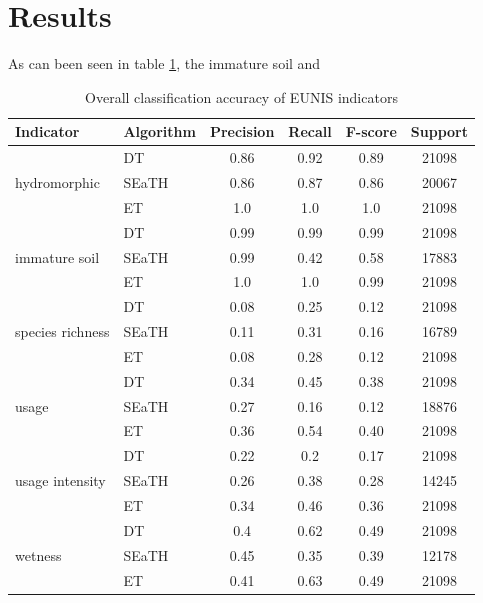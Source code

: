 \documentclass[authoryear, review,12pt,number]{elsarticle}
\begin{document}
\section{Results}
As can been seen in table \ref{tab:accuracy_indicators}, the immature soil and
\begin{table}
    \centering
    \begin{tabular}{l l c c c c}
    Indicator & Algorithm & Precision & Recall & F-score & 
    Support\\
    \hline
    \multirow{3}{*}{hydromorphic}
    & DT & 0.86 & 0.92 & 0.89 & 21098\\
    & SEaTH & 0.86 & 0.87 & 0.86 & 20067\\
    & ET & 1.0 & 1.0 & 1.0 & 21098\\
    \cline{2-6}
    \multirow{3}{*}{immature soil}
    & DT & 0.99 & 0.99 & 0.99 & 21098\\
    & SEaTH & 0.99 & 0.42 & 0.58 & 17883\\
    & ET & 1.0 & 1.0 & 0.99 & 21098\\
    \cline{2-6}
    \multirow{3}{*}{species richness}
    & DT & 0.08 & 0.25 & 0.12 & 21098\\
    & SEaTH & 0.11 & 0.31 & 0.16 & 16789\\
    & ET & 0.08 & 0.28 & 0.12 & 21098\\
    \cline{2-6}
    \multirow{3}{*}{usage}
    & DT & 0.34 & 0.45 & 0.38 & 21098\\
    & SEaTH & 0.27 & 0.16 & 0.12 & 18876\\
    & ET & 0.36 & 0.54 & 0.40 & 21098\\
    \cline{2-6}
    \multirow{3}{*}{usage intensity}
    & DT & 0.22 & 0.2 & 0.17 & 21098\\
    & SEaTH & 0.26 & 0.38 & 0.28 & 14245\\
    & ET & 0.34 & 0.46 & 0.36 & 21098\\
    \cline{2-6}
    \multirow{3}{*}{wetness}
    & DT & 0.4 & 0.62 & 0.49 & 21098\\
    & SEaTH & 0.45 & 0.35 & 0.39 & 12178\\
    & ET & 0.41 & 0.63 & 0.49 & 21098\\
    \end{tabular}
    \label{tab:classification_EUNIS}
    \caption{Overall classification accuracy of EUNIS indicators}
    \label{tab:accuracy_indicators}
\end{table}
\end{document}
